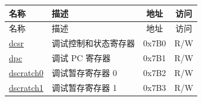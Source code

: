 \begin{longtable}{ | p{4.0cm} | p{8.4cm} | c | c| }
\hline\rowcolor{lightgray}
名称 & 描述 & 地址 & 访问 \\ \hline
\endfirsthead
\hline
\rowcolor{lightgray}
名称 & 描述 & 地址 & 访问 \\ \hline

\endhead
\endfoot

\hyperref[regdesc:LPDCSR]{dcsr} & 调试控制和状态寄存器  & 0x7B0 & R/W \\\hline
\hyperref[regdesc:LPDPC]{dpc} & 调试 PC 寄存器 & 0x7B1 & R/W \\\hline
\hyperref[regdesc:LPDSCRATCH0]{dscratch0} & 调试暂存寄存器 0 & 0x7B2 & R/W \\\hline
\hyperref[regdesc:LPDSCRATCH1]{dscratch1} & 调试暂存寄存器 1 & 0x7B3 & R/W \\\hline
\end{longtable}
